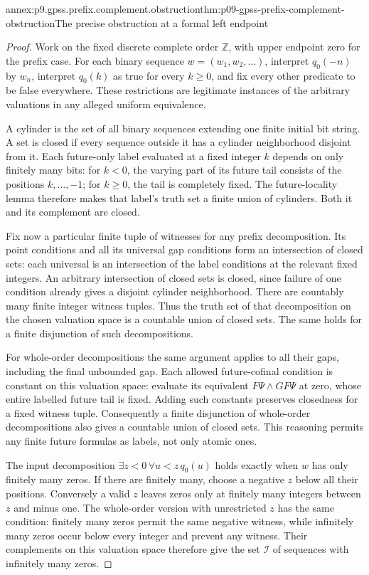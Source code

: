 \begin{annexitem}{annex:p9.gpss.prefix.complement.obstruction}{thm:p09-gpss-prefix-complement-obstruction}{The precise obstruction at a formal left endpoint}
\begin{proof}
Work on the fixed discrete complete
order \(\mathbb Z\), with upper
endpoint zero for the prefix case.
For each binary sequence
\(w=(w_1,w_2,\ldots)\), interpret
\(q_0(-n)\) by \(w_n\),
interpret \(q_0(k)\) as true
for every \(k\geq0\), and
fix every other predicate to be
false everywhere. These restrictions
are legitimate instances of the
arbitrary valuations in any alleged
uniform equivalence.

A cylinder is the set of all binary
sequences extending one finite
initial bit string. A set is closed
if every sequence outside it has
a cylinder neighborhood disjoint
from it. Each future-only label
evaluated at a fixed integer \(k\)
depends on only finitely many bits:
for \(k<0\), the varying part
of its future tail consists of
the positions \(k,\ldots,-1\);
for \(k\geq0\), the tail is
completely fixed. The future-locality
lemma therefore makes that label's
truth set a finite union of
cylinders. Both it and its
complement are closed.

Fix now a particular finite tuple
of witnesses for any prefix
decomposition. Its point conditions
and all its universal gap conditions
form an intersection of closed
sets: each universal is an
intersection of the label conditions
at the relevant fixed integers.
An arbitrary intersection of closed
sets is closed, since failure of
one condition already gives a
disjoint cylinder neighborhood.
There are countably many finite
integer witness tuples. Thus the
truth set of that decomposition
on the chosen valuation space
is a countable union of closed
sets. The same holds for a
finite disjunction of such
decompositions.

For whole-order decompositions the
same argument applies to all
their gaps, including the final
unbounded gap. Each allowed
future-cofinal condition is constant
on this valuation space: evaluate
its equivalent \(F\Psi\land GF\Psi\)
at zero, whose entire labelled
future tail is fixed. Adding
such constants preserves closedness
for a fixed witness tuple.
Consequently a finite disjunction
of whole-order decompositions also
gives a countable union of closed
sets. This reasoning permits any
finite future formulas as labels,
not only atomic ones.

The input decomposition
\(\exists z<0\,\forall u<z\,q_0(u)\)
holds exactly when \(w\) has
only finitely many zeros. If
there are finitely many, choose
a negative \(z\) below all
their positions. Conversely a
valid \(z\) leaves zeros only
at finitely many integers between
\(z\) and minus one. The
whole-order version with unrestricted
\(z\) has the same condition:
finitely many zeros permit the
same negative witness, while
infinitely many zeros occur below
every integer and prevent any
witness. Their complements on
this valuation space therefore
give the set \(\mathcal I\)
of sequences with infinitely
many zeros.


\end{proof}
\end{annexitem}
